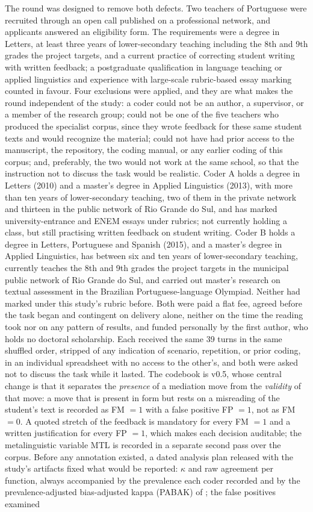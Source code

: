 \documentclass{sbc2023}%
\begin{document}
The round was designed to remove both defects. Two teachers of Portuguese were recruited through an open call published on a professional network, and applicants answered an eligibility form. The requirements were a degree in Letters, at least three years of lower-secondary teaching including the 8th and 9th grades the project targets, and a current practice of correcting student writing with written feedback; a postgraduate qualification in language teaching or applied linguistics and experience with large-scale rubric-based essay marking counted in favour. Four exclusions were applied, and they are what makes the round independent of the study: a coder could not be an author, a supervisor, or a member of the research group; could not be one of the five teachers who produced the specialist corpus, since they wrote feedback for these same student texts and would recognize the material; could not have had prior access to the manuscript, the repository, the coding manual, or any earlier coding of this corpus; and, preferably, the two would not work at the same school, so that the instruction not to discuss the task would be realistic. Coder A holds a degree in Letters (2010) and a master's degree in Applied Linguistics (2013), with more than ten years of lower-secondary teaching, two of them in the private network and thirteen in the public network of Rio Grande do Sul, and has marked university-entrance and ENEM essays under rubrics; not currently holding a class, but still practising written feedback on student writing. Coder B holds a degree in Letters, Portuguese and Spanish (2015), and a master's degree in Applied Linguistics, has between six and ten years of lower-secondary teaching, currently teaches the 8th and 9th grades the project targets in the municipal public network of Rio Grande do Sul, and carried out master's research on textual assessment in the Brazilian Portuguese-language Olympiad. Neither had marked under this study's rubric before. Both were paid a flat fee, agreed before the task began and contingent on delivery alone, neither on the time the reading took nor on any pattern of results, and funded personally by the first author, who holds no doctoral scholarship. Each received the same 39 turns in the same shuffled order, stripped of any indication of scenario, repetition, or prior coding, in an individual spreadsheet with no access to the other's, and both were asked not to discuss the task while it lasted. The codebook is v0.5, whose central change is that it separates the \textit{presence} of a mediation move from the \textit{validity} of that move: a move that is present in form but rests on a misreading of the student's text is recorded as FM $=1$ with a false positive FP $=1$, not as FM $=0$. A quoted stretch of the feedback is mandatory for every FM $=1$ and a written justification for every FP $=1$, which makes each decision auditable; the metalinguistic variable MTL is recorded in a separate second pass over the corpus. Before any annotation existed, a dated analysis plan released with the study's artifacts fixed what would be reported: $\kappa$ and raw agreement per function, always accompanied by the prevalence each coder recorded and by the prevalence-adjusted bias-adjusted kappa (PABAK) of \citet{byrt1993bias}; the false positives examined 
\end{document}
